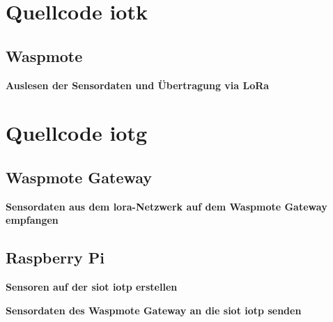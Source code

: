 \chapter{Quellcode \gls{iotk}}

\section{Waspmote}\label{appendix:waspmote}

\textbf{Auslesen der Sensordaten und Übertragung via LoRa}



\chapter{Quellcode \gls{iotg}}

\section{Waspmote Gateway}\label{appendix:waspmote-gateway}

\textbf{Sensordaten aus dem \gls{lora}-Netzwerk auf dem Waspmote Gateway empfangen}


\section{Raspberry Pi}\label{appendix:raspberrypi}

\textbf{Sensoren auf der \gls{siot} \gls{iotp} erstellen}


\textbf{Sensordaten des Waspmote Gateway an die \gls{siot} \gls{iotp} senden}

